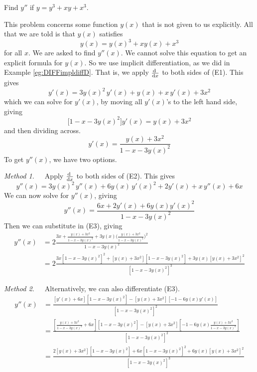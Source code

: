 \begin{eg}\label{eg:higherOrdDerivC}
Find $y''$ if $y=y^3+xy+x^3$.

\soln This problem concerns some function $y(x)$ that is not
given to us explicitly. All that we are told is that $y(x)$ satisfies
\begin{equation}
y(x)=y(x)^3+xy(x)+x^3
\tag{E1}
\end{equation}
for all $x$. We are asked to find $y''(x)$. We cannot solve this
equation to get an explicit formula for $y(x)$.  So we use implicit
differentiation, as we did in Example \ref{eg:DIFFimpldiffD}. That is, we apply
$\diff{}{x}$ to both sides of (E1). This gives
\begin{equation}
y'(x)=3y(x)^2\,y'(x)+y(x)+x\,y'(x)+3x^2
\tag{E2}
\end{equation}
which we can solve for $y'(x)$, by moving all $y'(x)$'s to the left hand
side, giving
\begin{equation*}
 \big[1-x-3y(x)^2\big]y'(x) = y(x)+3x^2
\end{equation*}
and then dividing across.
\begin{equation}
y'(x) = \frac{y(x)+3x^2}{1-x-3y(x)^2}
\tag{E3}\end{equation}
To get $y''(x)$, we have two options.

\noindent\emph{Method 1.}\ \ \  Apply $\diff{}{x}$ to both sides of (E2).
This gives
\begin{equation*}
y''(x)=3y(x)^2\,y''(x)+6y(x)\,y'(x)^2+2y'(x)+x\,y''(x)+6x
\end{equation*}
We can now solve for $y''(x)$, giving
\begin{equation}
y''(x) = \frac{6x+2y'(x)+6y(x)y'(x)^2}{1-x-3y(x)^2}
\tag{E4}
\end{equation}
Then we can substitute in (E3), giving
\begin{align*}
y''(x) &= 2\frac{3x+ \frac{y(x)+3x^2}{1-x-3y(x)^2}
              +3y(x) \big(\frac{y(x)+3x^2}{1-x-3y(x)^2}\big)^2}
         {1-x-3y(x)^2} \\
&= 2\frac{3x{[1-x-3y(x)^2]}^2+ [y(x)+3x^2][1-x-3y(x)^2]
              +3y(x) {[y(x)+3x^2]}^2}{{[1-x-3y(x)^2]}^3}
\end{align*}

\noindent\emph{Method 2.}\ \ \  Alternatively, we can also differentiate (E3).
\begin{align*}
y''(x) &= \frac{[y'(x)+6x][1-x-3y(x)^2]-
           [y(x)+3x^2][-1-6y(x)y'(x)]}{{[1-x-3y(x)^2]}^2} \\[0.05in]
&= \frac{[\frac{y(x)+3x^2}{1-x-3y(x)^2}+6x][1-x-3y(x)^2]-
           [y(x)+3x^2][-1-6y(x)\frac{y(x)+3x^2}{1-x-3y(x)^2}]}
                                       {{[1-x-3y(x)^2]}^2}\\[0.05in]
&= \frac{2[y(x)+3x^2][1-x-3y(x)^2]+6x{[1-x-3y(x)^2]}^2
           +6y(x){[y(x)+3x^2]}^2}
                                       {{[1-x-3y(x)^2]}^3}
\end{align*}


\end{eg}
